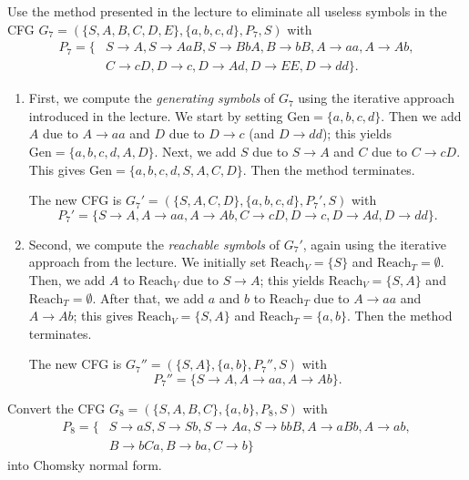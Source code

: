\documentclass{exercise}
\begin{document}
\subtask Use the method presented in the lecture to eliminate all useless symbols in
  the CFG $G_7=(\{S,A,B,C,D,E\},\{a,b,c,d\},P_7,S)$ with
  \begin{align*}
     P_7 =\{ & S\to A, S\to AaB, S\to BbA, B\to bB, A\to aa, A\to Ab,\\
             & C\to cD, D\to c, D\to Ad, D\to EE, D\to dd\}.
  \end{align*}

  \begin{solution}
    \begin{enumerate}[label=\Roman*.]
      \item First, we compute the \emph{generating symbols} of $G_7$ 
        using the iterative approach introduced in the lecture.
        We start by setting $\mathrm{Gen} = \{a,b,c,d\}$.
        Then we add $A$ due to $A \to aa$ and $D$ due to
        $D \to c$ (and $D\to dd$); this yields $\mathrm{Gen} = \{a,b,c,d,A,D\}$.
        Next, we add $S$ due to $S \to A$ and $C$ due to $C\to cD$.
        This gives $\mathrm{Gen} = \{a,b,c,d,S,A,C,D\}$.
        Then the method terminates.
      
        The new CFG is $G_7' = (\{S,A,C,D\},\{a,b,c,d\},P_7',S)$ with
        \[ P_7' = \{S\to A,A\to aa, A \to Ab, C\to cD, D\to c, D \to Ad, D\to dd\}. \]
      \item Second, we compute the \emph{reachable symbols} of $G_7'$, again
        using the iterative approach from the lecture.  We initially set
        $\mathrm{Reach}_V = \{S\}$ and $\mathrm{Reach}_T = \emptyset$.
        Then, we add $A$ to $\mathrm{Reach}_V$ due to $S \to A$;
        this yields $\mathrm{Reach}_V = \{S,A\}$ and $\mathrm{Reach}_T = \emptyset$.
        After that, we add $a$ and $b$ to $\mathrm{Reach}_T$ due to
        $A \to aa$ and $A\to Ab$; this gives $\mathrm{Reach}_V = \{S,A\}$
        and $\mathrm{Reach}_T = \{a,b\}$.
        Then the method terminates.
        
        The new CFG is $G_7'' = (\{S,A\},\{a,b\},P_7'',S)$ with
        \[ P_7'' = \{S \to A, A \to aa, A \to Ab\}. \]
    \end{enumerate}
  \end{solution}

\subtask Convert the CFG $G_8=(\{S,A,B,C\},\{a,b\},P_8,S)$ with
  \begin{align*}
    P_8 = \{ & S\to aS, S\to Sb, S\to Aa, S\to bbB, A\to aBb, A\to ab,\\
             & B\to bCa, B\to ba, C\to b\}
  \end{align*}
  into Chomsky normal form.
\end{document}
